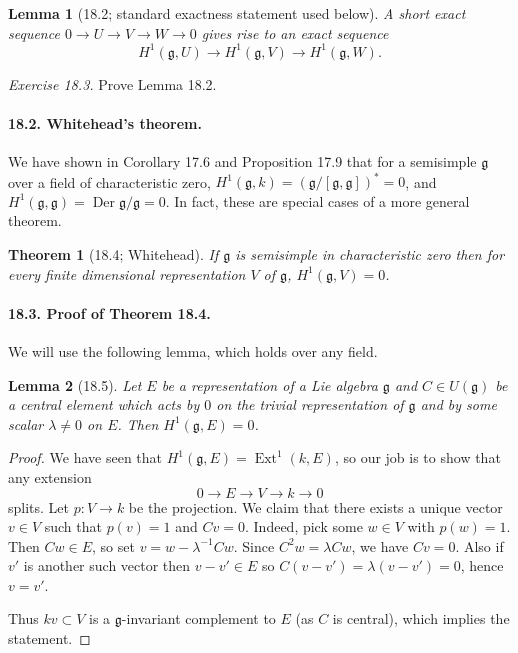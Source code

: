 \documentclass[UTF8,11pt]{ctexart}
\newtheorem*{theorem}{Theorem}
\newtheorem*{lemma}{Lemma}
\begin{document}
\begin{lemma}[18.2; standard exactness statement used below]
A short exact sequence $0\to U\to V\to W\to0$ gives rise to an exact sequence
\[
H^1(\mathfrak g,U)\longrightarrow H^1(\mathfrak g,V)\longrightarrow H^1(\mathfrak g,W).
\]
\end{lemma}
\noindent\emph{Exercise 18.3.} Prove Lemma 18.2.

\paragraph{18.2. Whitehead's theorem.}
We have shown in Corollary 17.6 and Proposition 17.9 that for a semisimple $\mathfrak g$ over a field of characteristic zero, $H^1(\mathfrak g,k)=(\mathfrak g/[\mathfrak g,\mathfrak g])^*=0$, and $H^1(\mathfrak g,\mathfrak g)=\operatorname{Der}\mathfrak g/\mathfrak g=0$. In fact, these are special cases of a more general theorem.

\begin{theorem}[18.4; Whitehead]
If $\mathfrak g$ is semisimple in characteristic zero then for every finite dimensional representation $V$ of $\mathfrak g$, $H^1(\mathfrak g,V)=0$.
\end{theorem}

\paragraph{18.3. Proof of Theorem 18.4.}
We will use the following lemma, which holds over any field.
\begin{lemma}[18.5]
Let $E$ be a representation of a Lie algebra $\mathfrak g$ and $C\in U(\mathfrak g)$ be a central element which acts by $0$ on the trivial representation of $\mathfrak g$ and by some scalar $\lambda\ne0$ on $E$. Then $H^1(\mathfrak g,E)=0$.
\end{lemma}
\begin{proof}
We have seen that $H^1(\mathfrak g,E)=\operatorname{Ext}^1(k,E)$, so our job is to show that any extension
\[
0\to E\to V\to k\to0
\]
splits. Let $p:V\to k$ be the projection. We claim that there exists a unique vector $v\in V$ such that $p(v)=1$ and $Cv=0$. Indeed, pick some $w\in V$ with $p(w)=1$. Then $Cw\in E$, so set $v=w-\lambda^{-1}Cw$. Since $C^2w=\lambda Cw$, we have $Cv=0$. Also if $v'$ is another such vector then $v-v'\in E$ so $C(v-v')=\lambda(v-v')=0$, hence $v=v'$.

Thus $kv\subset V$ is a $\mathfrak g$-invariant complement to $E$ (as $C$ is central), which implies the statement.
\end{proof}
\end{document}
